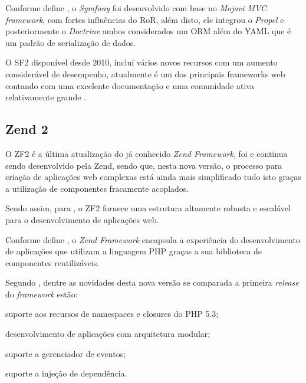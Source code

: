 Conforme define
, o
\textit{Symfony} foi desenvolvido com base no \textit{Mojavi MVC framework},
com fortes influências do \ac{RoR}, além disto, ele integrou o \textit{Propel} e
posteriormente o \textit{Doctrine} ambos considerados um \ac{ORM} além do
\ac{YAML} que é um padrão de serialização de dados.

O \ac{SF2} disponível desde 2010, incluí vários novos recursos com um aumento
considerável de desempenho, atualmente é um dos principais frameworks web
contando com uma excelente documentação e uma comunidade ativa relativamente
grande \cite{buildingPHPApplicationsWithSymfonyCakePHPAndZendFramework}.

\subsection{Zend 2}

O \ac{ZF2} é a última atualização do já conhecido \textit{Zend
Framework}, foi e continua sendo desenvolvido pela \acs{Zend}, sendo que, nesta
nova versão, o processo para criação de aplicações web complexas está ainda mais
simplificado tudo isto graças a utilização de componentes fracamente acoplados.

Sendo assim, para , o
\acs{ZF2} fornece uma estrutura altamente robusta e escalável para o
desenvolvimento de aplicações web.

Conforme define
, o
\textit{Zend Framework} encapsula a experiência do desenvolvimento de aplicações
que utilizam a linguagem \acs{PHP} graças a sua biblioteca de componentes reutilizáveis.

Segundo , dentre as novidades
desta nova versão se comparada a primeira \textit{release} do \textit{framework}
estão:

\begin{alineas}
    \item suporte aos recursos de namespaces e closures do \acs{PHP} 5.3;
    \item desenvolvimento de aplicações com arquitetura modular;
    \item suporte a gerenciador de eventos;
    \item suporte a injeção de dependência.
\end{alineas}